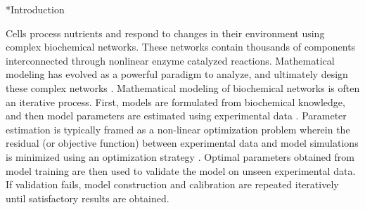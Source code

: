 \documentclass[12pt]{article}
\makeatletter
\renewcommand\section{\@startsection
	{subsection}{2}{0mm}
	{-0.2in}
	{0.05\baselineskip}
	{\normalfont\large\bfseries}}
\makeatother
\begin{document}

\pagebreak

\setcounter{page}{1}

\linenumbers


\section*{Introduction}

Cells process nutrients and respond to changes in their environment using complex biochemical networks. These networks contain thousands of components
interconnected through nonlinear enzyme catalyzed reactions. Mathematical modeling has evolved as a powerful paradigm to analyze, and ultimately design these complex networks \cite{assmus2006dynamics, Riel2006aa,Jaqaman:2006aa,kitano2002systems,hood2004systems}. Mathematical modeling of biochemical networks is often an iterative process.
First, models are formulated from biochemical knowledge, and then model parameters are estimated using experimental data \cite{Aldridge:2006aa,banga2008optimization,ashyraliyev2009systems}.
Parameter estimation is typically framed as a non-linear optimization problem wherein the residual (or objective function) between experimental data and model simulations is minimized using an optimization strategy \cite{moles2003parameter}. Optimal parameters obtained from model training are then used to validate the model on unseen experimental data.
If validation fails, model construction and calibration are repeated iteratively until satisfactory results are obtained.
\end{document}
